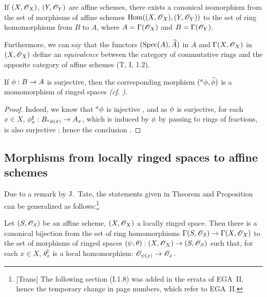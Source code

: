 \begin{cor}[1.7.4]
\label{1.1.7.4}
If $(X,\mathscr{O}_X)$, $(Y,\mathscr{O}_Y)$ are affine schemes, there exists a canonical isomorphism from
the set of morphisms of affine schemes ${\mathop{\mathrm{Hom}}\nolimits}((X,\mathscr{O}_X),(Y,\mathscr{O}_Y))$ to the set of
ring homomorphisms from $B$ to $A$, where $A=\Gamma(\mathscr{O}_X)$ and $B=\Gamma(\mathscr{O}_Y)$.
\end{cor}

Furthermore, we can say that the functors $({\mathop{\mathrm{Spec}}\nolimits}(A),\widetilde{A})$ in $A$ and
$\Gamma(X,\mathscr{O}_X)$ in $(X,\mathscr{O}_X)$ define an \emph{equivalence} between the category of
commutative rings and the opposite category of affine schemes (T, I, 1.2).

\begin{cor}[1.7.5]
\label{1.1.7.5}
If $\phi:B\to A$ is surjective, then the corresponding morphism
$({}^a\phi,\widetilde{\phi})$ is a momomorphism of ringed spaces
\emph{(cf. )}.
\end{cor}

\begin{proof}
\label{proof-1.1.7.5}
Indeed, we know that ${}^a\phi$ is injective , and as $\phi$ is
surjective, for each $x\in X$, $\phi_x^\sharp:B_{{}^a\phi(x)}\to A_x$, which is induced
by $\phi$ by passing to rings of fractions, is also surjective ; hence
the conclusion .
\end{proof}

\subsection{Morphisms from locally ringed spaces to affine schemes}
\label{subsection-morphisms-lrs-to-affine-schemes}

Due to a remark by J.~Tate, the statements given in Theorem 
and Proposition 
can be generalized as follows:\footnote{[Trans] The following section (I.1.8) was added in
the errata of EGA~II, hence the temporary change in page numbers, which refer to EGA~II.}

\begin{prop}[1.8.1]
\label{1.1.8.1}
Let $(S,\mathscr{O}_S)$ be an affine scheme, $(X,\mathscr{O}_X)$ a locally ringed space. Then there is a
canonical bijection from the set of ring homomorphisms
$\Gamma(S,\mathscr{O}_S)\to\Gamma(X,\mathscr{O}_X)$ to the set of morphisms of ringed spaces
$(\psi,\theta):(X,\mathscr{O}_X)\to(S,\mathscr{O}_S)$ such that, for each $x\in X$, $\theta_x^\sharp$ is a
local homomorphism: $\mathscr{O}_{\psi(x)}\to\mathscr{O}_x$.
\end{prop}

